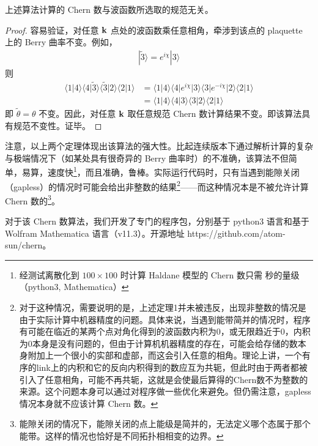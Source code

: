 \begin{theorem}
上述算法计算的 Chern 数与波函数所选取的规范无关。
\end{theorem}

\begin{proof}
容易验证，对任意 $\mathbf{k}$ 点处的波函数乘任意相角，牵涉到该点的 plaquette 上的 Berry 曲率不变。例如，
\begin{align}
|\tilde{3}\rangle = e^{i\chi} |3\rangle
\end{align}
则
\begin{align}
\langle1|4\rangle\langle4|\tilde{3}\rangle\langle\tilde{3}|2\rangle\langle2|1\rangle 
&= \langle1|4\rangle\langle4|e^{i\chi}|3\rangle\langle3|e^{-i\chi}|2\rangle\langle2|1\rangle \\
&= \langle1|4\rangle\langle4|3\rangle\langle3|2\rangle\langle2|1\rangle
\end{align}
即 $\tilde{\theta} = \theta$ 不变。因此，对任意 $\mathbf{k}$ 取任意规范 Chern 数计算结果不变。即该算法具有规范不变性。证毕。
\end{proof}

注意，以上两个定理体现出该算法的强大性。比起连续版本下通过解析计算的复杂与极端情况下（如某处具有很奇异的 Berry 曲率时）的不准确，该算法不但简单，易算，速度快\footnote{经测试离散化到 $100\times100$ 时计算 Haldane 模型的 Chern 数只需 秒的量级（python3, Mathematica）}，而且准确，鲁棒。实际运行代码时，只有当遇到能隙关闭（gapless）的情况时可能会给出非整数的结果\footnote{对于这种情况，需要说明的是，上述定理1并未被违反，出现非整数的情况是由于实际计算中机器精度的问题。具体来说，当遇到能带简并的情况时，程序有可能在临近的某两个点对角化得到的波函数内积为0，或无限趋近于0，内积为0本身是没有问题的，但由于计算机机器精度的存在，可能会给存储的数本身附加上一个很小的实部和虚部，而这会引入任意的相角。理论上讲，一个有序的link上的内积和它的反向内积得到的数应互为共轭，但此时由于两者都被引入了任意相角，可能不再共轭，这就是会使最后算得的Chern数不为整数的来源。这个问题本身可以通过对程序做一些优化来避免。但仍需注意，gapless 情况本身就不应该计算 Chern 数。}——而这种情况本是不被允许计算 Chern 数的\footnote{能隙关闭的情况下，能隙关闭的点上能级是简并的，无法定义哪个态属于那个能带\cite{topobook}。这样的情况也恰好是不同拓扑相相变的边界。}。


对于该 Chern 数算法，我们开发了专门的程序包，分别基于 python3 语言和基于 Wolfram Mathematica 语言（v11.3）。开源地址\cite{repo-chern} https://github.com/atom-sun/chern。
